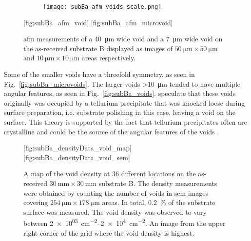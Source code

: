 \begin{figure}
    \centering
    \begin{subfigure}[c]{0.032\linewidth}
        \label{fig:subBa_afm_voids_scale}\captionsetup{list=no}
        \texttt{[image: subBa\_afm\_voids\_scale.png]}
    \end{subfigure}
    \hfill
    [fig:subBa_afm_void]
    \hfill
    [fig:subBa_afm_microvoid]
    \caption[\Ac{afm} measurements of voids on as-received substrate B.]{\Ac{afm} measurements of  a \SI{40}{\micro\metre} wide void and  a \SI{7}{\micro\metre} wide void on the as-received substrate B displayed as images of $\SI{50}{\micro\metre}\times\SI{50}{\micro\metre}$ and $\SI{10}{\micro\metre}\times\SI{10}{\micro\metre}$ areas respectively.}
    \label{fig:subBa_afm_voids}
\end{figure}

Some of the smaller voids have a threefold symmetry, as seen in Fig.~\ref{fig:subBa_microvoids}. The larger voids \SI{>10}{\micro\metre} tended to have multiple angular features, as seen in Fig.~\ref{fig:subBa_voids}. \citet{reddy2013cross} speculate that these voids originally was occupied by a tellurium precipitate that was knocked loose during surface preparation, i.e. substrate polishing in this case, leaving a void on the surface. This theory is supported by the fact that tellurium precipitates often are crystalline and could be the source of the angular features of the voids \citep{wang2008observation}.

\begin{figure}[htbp]
    \centering
        [fig:subBa_densityData_void_map]
        \hfill
        [fig:subBa_densityData_void_sem]
    \caption[Map of the void density on the as-received substrate B.]{ A map of the void density at 36 different locations on the as-received $\SI{30}{\milli\metre}\times\SI{30}{\milli\metre}$ substrate B. The density measurements were obtained by counting the number of voids in \ac{sem} images covering $\SI{254}{\micro\metre}\times\SI{178}{\micro\metre}$ areas. In total, \SI{0.2}{\percent} of the substrate surface was measured. The void density was observed to vary between \SIrange{2e+03}{2e+4}{\centi\metre^{-2}}.  An image from the upper right corner of the grid where the void density is highest.}
    \label{fig:subBa_densityData_voids}
\end{figure}

